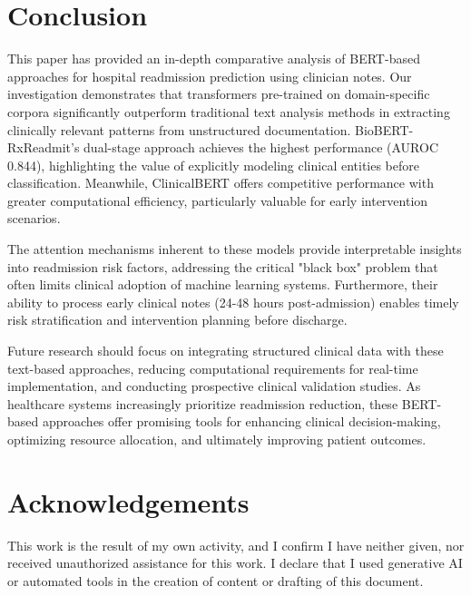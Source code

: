 \documentclass[3p,times,procedia]{elsarticle}
\begin{document}
\section{Conclusion}
This paper has provided an in-depth comparative analysis of BERT-based approaches for hospital readmission prediction using clinician notes. Our investigation demonstrates that transformers pre-trained on domain-specific corpora significantly outperform traditional text analysis methods in extracting clinically relevant patterns from unstructured documentation. BioBERT-RxReadmit's dual-stage approach achieves the highest performance (AUROC 0.844), highlighting the value of explicitly modeling clinical entities before classification. Meanwhile, ClinicalBERT offers competitive performance with greater computational efficiency, particularly valuable for early intervention scenarios.

The attention mechanisms inherent to these models provide interpretable insights into readmission risk factors, addressing the critical "black box" problem that often limits clinical adoption of machine learning systems. Furthermore, their ability to process early clinical notes (24-48 hours post-admission) enables timely risk stratification and intervention planning before discharge.

Future research should focus on integrating structured clinical data with these text-based approaches, reducing computational requirements for real-time implementation, and conducting prospective clinical validation studies. As healthcare systems increasingly prioritize readmission reduction, these BERT-based approaches offer promising tools for enhancing clinical decision-making, optimizing resource allocation, and ultimately improving patient outcomes.

\section{Acknowledgements}
This work is the result of my own activity, and I confirm I have neither given, nor received unauthorized assistance for this work. I declare that I used generative AI or automated tools in the creation of content or drafting of this document.
\end{document}
